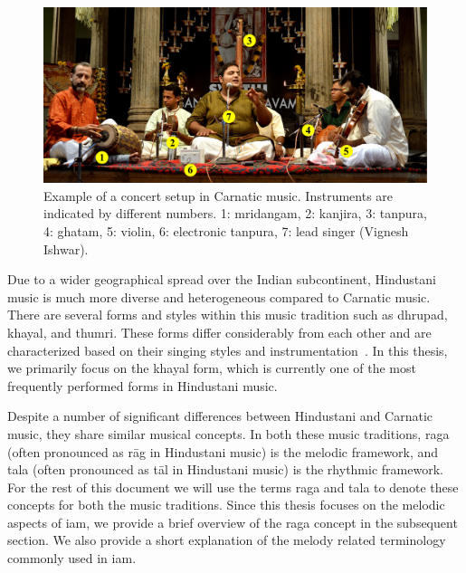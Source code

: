 \begin{figure}
	\begin{center}
		\includegraphics[width=\figSizeHundred]{ch02_background/figures/VigneshConcert.pdf}
	\end{center}
	\caption[Example of a concert setup in Carnatic music]{Example of a concert setup in Carnatic music. Instruments are indicated by different numbers. 1: \gls{mridangam}, 2: \gls{kanjira}, 3: \gls{tanpura}, 4: \gls{ghatam}, 5: violin, 6: electronic \gls{tanpura}, 7: lead singer (Vignesh Ishwar). }
	\label{fig:concert_picture}
\end{figure}



Due to a wider geographical spread over the Indian subcontinent, Hindustani music is much more diverse and heterogeneous compared to Carnatic music. There are several forms and styles within this music tradition such as \gls{dhrupad}, \gls{khayal}, and \gls{thumri}. These forms differ considerably from each other and are characterized based on their singing styles and instrumentation~\citep{Bor2010}. In this thesis, we primarily focus on the \gls{khayal} form, which is currently one of the most frequently performed forms in Hindustani music. 

Despite a number of significant differences between Hindustani and Carnatic music, they share similar musical concepts. In both these music traditions, \gls{raga} (often pronounced as r\={a}g in Hindustani music) is the melodic framework, and \gls{tala} (often pronounced as t\={a}l in Hindustani music) is the rhythmic framework. For the rest of this document we will use the terms \gls{raga} and \gls{tala} to denote these concepts for both the music traditions. Since this thesis focuses on the melodic aspects of \gls{iam}, we provide a brief overview of the \gls{raga} concept in the subsequent section. We also provide a short explanation of the melody related terminology commonly used in \gls{iam}. 


